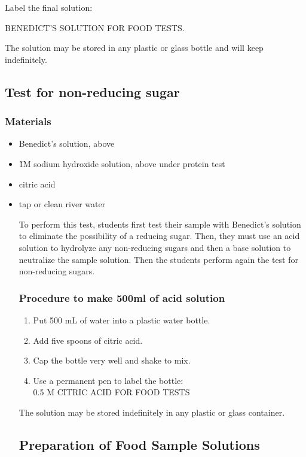 Label the final solution:

\begin{center}	
BENEDICT'S SOLUTION FOR FOOD TESTS.
\end{center}

The solution may be stored in any plastic or glass bottle and will keep indefinitely.

\subsection{Test for non-reducing sugar}

\subsubsection{Materials}
\begin{itemize}
\item{Benedict's solution, above}
\item{\~1M sodium hydroxide solution, above under protein test}
\item{citric acid}
\item{tap or clean river water}

To perform this test, students first test their sample with Benedict's solution to eliminate the possibility of a reducing sugar. Then, they must use an acid solution to hydrolyze any non-reducing sugars and then a base solution to neutralize the sample solution. Then the students perform again the test for non-reducing sugars.

\subsubsection{Procedure to make 500ml of acid solution}
\begin{enumerate}
\item{Put 500 mL of water into a plastic water bottle.}
\item{Add five spoons of citric acid.}
\item{Cap the bottle very well and shake to mix.}
\item{Use a permanent pen to label the bottle:\\
0.5 M CITRIC ACID FOR FOOD TESTS}
\end{enumerate}

The solution may be stored indefinitely in any plastic or glass container.

\subsection{Preparation of Food Sample Solutions}


\end{itemize}
